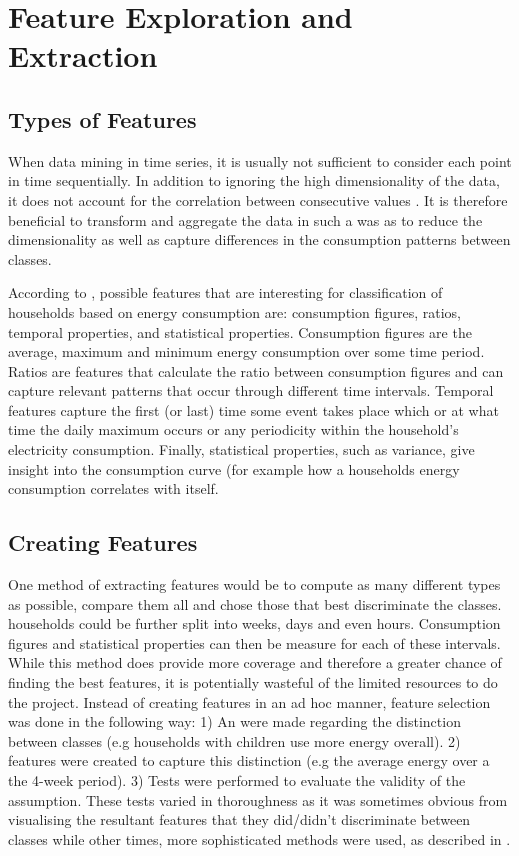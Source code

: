 \chapter{Feature Exploration and Extraction}

\section{Types of Features}
When data mining in time series, it is usually not sufficient to consider each point in time sequentially. In addition to ignoring the high dimensionality of the data,  it does not account for the correlation between consecutive values \cite{Moerchen}. It is therefore beneficial to transform and aggregate the data in such a was as to reduce the dimensionality as well as capture differences in the consumption patterns between classes. 

According to \cite{Beckel 2}, possible features that are interesting for classification of households based on energy consumption are: consumption figures, ratios, temporal properties, and statistical properties. Consumption figures are the average, maximum and minimum energy consumption over some time period. Ratios are features that calculate the ratio between consumption figures and can capture relevant patterns that occur through different time intervals. Temporal features capture the first (or last) time some event takes place which or at what time the daily maximum occurs or any periodicity within the household's electricity consumption. Finally, statistical properties, such as variance, give insight into the consumption curve (for example how a households energy consumption correlates with itself.



\section{Creating Features}
One method of extracting features would be to compute as many different types as possible, compare them all and chose those that best discriminate the classes. households could be further split into weeks, days and even hours. Consumption figures and statistical properties can then be measure for each of these intervals. While this method does provide more coverage and therefore a greater chance of finding the best features, it is potentially wasteful of the limited resources to do the project. Instead of creating features in an ad hoc manner, feature selection was done in the following way: 1) An were made regarding the distinction between classes (e.g households with children use more energy overall). 2) features were created to capture this distinction (e.g the average energy over a the 4-week period). 3) Tests were performed to evaluate the validity of the assumption. These tests varied in thoroughness as it was sometimes obvious from visualising the resultant features that they did/didn't discriminate between classes while other times, more sophisticated methods were used, as described in \featureSelectionSection.
\linebreak

